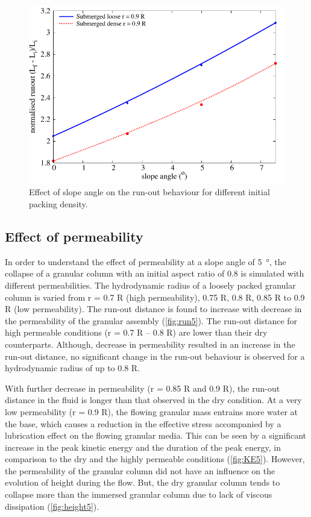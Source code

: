\begin{figure}
\centering
\includegraphics[width=0.97\columnwidth]{slope_runout}
\caption{Effect of slope angle on the run-out behaviour for different initial 
packing density.}
\label{fig:slope_runout}
\end{figure}

\clearpage
\subsection{Effect of permeability}

In order to understand the effect of permeability at a slope angle of 
\SI{5}{\degree}, the collapse of a granular column with an initial aspect ratio 
of 0.8 is simulated with different permeabilities. The hydrodynamic radius of 
a loosely packed granular column is varied from r = 0.7 R (high permeability), 
0.75 R, 0.8 R, 0.85 R to 0.9 R (low permeability). The run-out distance is 
found to increase with decrease in the permeability of the granular assembly 
(\cref{fig:run5}). The run-out distance for high permeable conditions (r = 
0.7 R -- 0.8 R) are lower than their dry counterparts. Although, decrease in 
permeability resulted in an increase in the run-out distance, no significant 
change in the run-out behaviour is observed for a hydrodynamic radius of up to 
0.8 R.

With further decrease in permeability (r = 0.85 R and 0.9 R), the run-out 
distance in the fluid is longer than that observed in the dry 
condition. At a very low permeability (r = 0.9 R), the flowing granular mass
entrains more water at the base, which causes a reduction in the effective 
stress accompanied by a lubrication effect on the flowing granular media. This 
can be seen by a significant increase in the peak kinetic energy and the 
duration of the peak energy, in comparison to the dry and the highly permeable 
conditions (\cref{fig:KE5}). However, the permeability of the granular 
column did not have an influence on the evolution of height during the flow. 
But, the dry granular column tends to collapse more than the immersed granular 
column due to lack of viscous dissipation (\cref{fig:height5}).

